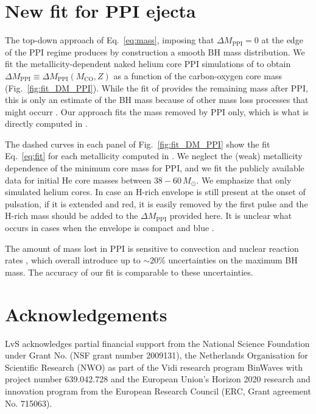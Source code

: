 \documentclass[twocolumn]{aastex63}
\DeclareRobustCommand{\Eqref}[1]{Eq.~\ref{#1}}
\DeclareRobustCommand{\Figref}[1]{Fig.~\ref{#1}}
\begin{document}
\section{New fit for PPI ejecta}

The top-down approach of \Eqref{eq:mass}, imposing that
$\Delta M_\mathrm{PPI}=0$ at the edge of the PPI regime
produces by construction a smooth BH mass
distribution. We fit the metallicity-dependent naked helium core PPI
simulations of \cite{farmer:19} to obtain
$\Delta M_\mathrm{PPI} \equiv \Delta M_\mathrm{PPI}(M_\mathrm{CO},Z)$ as
a function of the carbon-oxygen core mass (\Figref{fig:fit_DM_PPI}). While the fit of
\cite{farmer:19} provides the remaining mass after PPI, this is only
an estimate of the BH mass because of other mass loss processes that
might occurr \citep[e.g.,][]{renzo:20csm, powell:21, rahman:22}. Our approach
fits the mass removed by PPI only, which is what is directly computed
in \cite{farmer:19}.


The dashed curves in each panel of \Figref{fig:fit_DM_PPI} show the
fit \Eqref{eq:fit} for each metallicity computed in
\cite{farmer:19}. We neglect the (weak) metallicity dependence of the
minimum core mass for PPI, and we fit the publicly available data for initial He core
masses between $38-60\,M_\odot$.  We emphasize that \cite{farmer:19}
only simulated helium cores. In case an H-rich envelope is still
present at the onset of pulsation, if it is extended and red, it
is easily removed by the first pulse \citep[][]{woosley:17,renzo:20csm} and the H-rich mass should be added to the
$\Delta M_\mathrm{PPI}$ provided here. It is unclear what occurs in
cases when the envelope is compact and blue \cite{dicarlo:19, renzo:20merger, costa:21}.

The amount of mass lost in PPI is sensitive to convection
\cite{renzo:20conv} and nuclear reaction rates \cite{farmer:19,
  farmer:20, costa:21, woosley:21, mehta:21}, which overall introduce
up to $\sim{}20\%$ uncertainties on the maximum BH mass. The accuracy
of our fit is comparable to these uncertainties.

\section*{Acknowledgements}
LvS acknowledges partial financial support from the  National Science Foundation under Grant No. (NSF grant number 2009131), the Netherlands Organisation for Scientific Research (NWO) as part of the Vidi research program BinWaves with project number 639.042.728 and the European Union’s Horizon 2020 research and innovation program from the European Research Council (ERC, Grant agreement No. 715063).


\newpage

\end{document}
